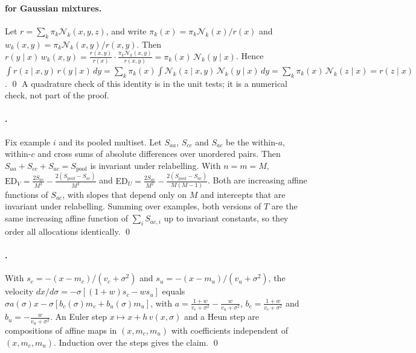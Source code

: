 \documentclass{article}
\theoremstyle{plain}
\theoremstyle{definition}
\theoremstyle{remark}
\newcommand{\ED}{\mathrm{ED}}
\begin{document}
\paragraph{ for Gaussian mixtures.}
Let $r=\sum_k\pi_k\mathcal N_k(x,y,z)$, and write $\pi_k(x)=\pi_k\mathcal N_k(x)/r(x)$ and $w_k(x,y)=\pi_k\mathcal N_k(x,y)/r(x,y)$.
Then $r(y\mid x)\,w_k(x,y)=\frac{r(x,y)}{r(x)}\cdot\frac{\pi_k\mathcal N_k(x,y)}{r(x,y)}=\pi_k(x)\,\mathcal N_k(y\mid x)$.
Hence $\int r(z\mid x,y)\,r(y\mid x)\,dy=\sum_k\pi_k(x)\int\mathcal N_k(z\mid x,y)\,\mathcal N_k(y\mid x)\,dy=\sum_k\pi_k(x)\,\mathcal N_k(z\mid x)=r(z\mid x)$. \qed
A quadrature check of this identity is in the unit tests; it is a numerical check, not part of the proof.

\paragraph{.}
Fix example $i$ and its pooled multiset. Let $S_{aa}$, $S_{cc}$ and $S_{ac}$ be the within-$a$, within-$c$ and cross sums of absolute differences over unordered pairs. Then $S_{aa}+S_{cc}+S_{ac}=S_{\mathrm{pool}}$ is invariant under relabelling.
With $n=m=M$, $\ED_V=\frac{2S_{ac}}{M^2}-\frac{2(S_{\mathrm{pool}}-S_{ac})}{M^2}$ and $\ED_U=\frac{2S_{ac}}{M^2}-\frac{2(S_{\mathrm{pool}}-S_{ac})}{M(M-1)}$.
Both are increasing affine functions of $S_{ac}$, with slopes that depend only on $M$ and intercepts that are invariant under relabelling.
Summing over examples, both versions of $T$ are the same increasing affine function of $\sum_i S_{ac,i}$ up to invariant constants, so they order all allocations identically. \qed

\paragraph{.}
With $s_c=-(x-m_c)/(v_c+\sigma^2)$ and $s_u=-(x-m_u)/(v_u+\sigma^2)$, the velocity $dx/d\sigma=-\sigma[(1+w)s_c-ws_u]$ equals $\sigma a(\sigma)x-\sigma[b_c(\sigma)m_c+b_u(\sigma)m_u]$, with $a=\frac{1+w}{v_c+\sigma^2}-\frac{w}{v_u+\sigma^2}$, $b_c=\frac{1+w}{v_c+\sigma^2}$ and $b_u=-\frac{w}{v_u+\sigma^2}$.
An Euler step $x\mapsto x+h\,v(x,\sigma)$ and a Heun step are compositions of affine maps in $(x,m_c,m_u)$ with coefficients independent of $(x,m_c,m_u)$. Induction over the steps gives the claim. \qed
\end{document}
